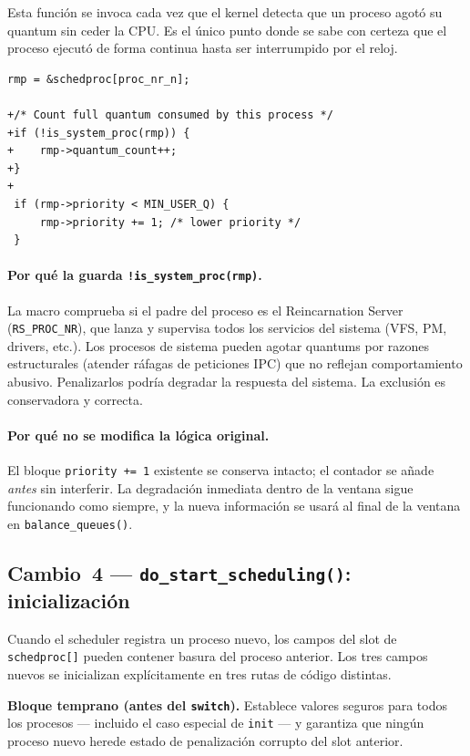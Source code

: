 \documentclass[11pt,a4paper]{article}
\begin{document}
Esta funci\'on se invoca cada vez que el kernel detecta que un proceso agot\'o su
quantum sin ceder la CPU. Es el \'unico punto donde se sabe con certeza que el proceso
ejecut\'o de forma continua hasta ser interrumpido por el reloj.

\begin{lstlisting}[style=diffstyle,caption={Diff de \texttt{do\_noquantum()}}]
 rmp = &schedproc[proc_nr_n];

+/* Count full quantum consumed by this process */
+if (!is_system_proc(rmp)) {
+    rmp->quantum_count++;
+}
+
 if (rmp->priority < MIN_USER_Q) {
     rmp->priority += 1; /* lower priority */
 }
\end{lstlisting}

\paragraph{Por qu\'e la guarda \texttt{!is\_system\_proc(rmp)}.}
La macro comprueba si el padre del proceso es el Reincarnation Server
(\texttt{RS\_PROC\_NR}), que lanza y supervisa todos los servicios del sistema (VFS,
PM, drivers, etc.). Los procesos de sistema pueden agotar quantums por razones
estructurales (atender r\'afagas de peticiones IPC) que no reflejan comportamiento
abusivo. Penalizarlos podr\'ia degradar la respuesta del sistema. La exclusi\'on es
conservadora y correcta.

\paragraph{Por qu\'e no se modifica la l\'ogica original.}
El bloque \texttt{priority += 1} existente se conserva intacto; el contador se a\~nade
\emph{antes} sin interferir. La degradaci\'on inmediata dentro de la ventana sigue
funcionando como siempre, y la nueva informaci\'on se usar\'a al final de la ventana en
\texttt{balance\_queues()}.

\subsection{Cambio~4 --- \texttt{do\_start\_scheduling()}: inicializaci\'on}

Cuando el scheduler registra un proceso nuevo, los campos del slot de
\texttt{schedproc[]} pueden contener basura del proceso anterior. Los tres campos nuevos
se inicializan expl\'icitamente en tres rutas de c\'odigo distintas.

\medskip
\noindent\textbf{Bloque temprano (antes del \texttt{switch}).}
Establece valores seguros para todos los procesos --- incluido el caso especial de
\texttt{init} --- y garantiza que ning\'un proceso nuevo herede estado de penalizaci\'on
corrupto del slot anterior.
\end{document}
